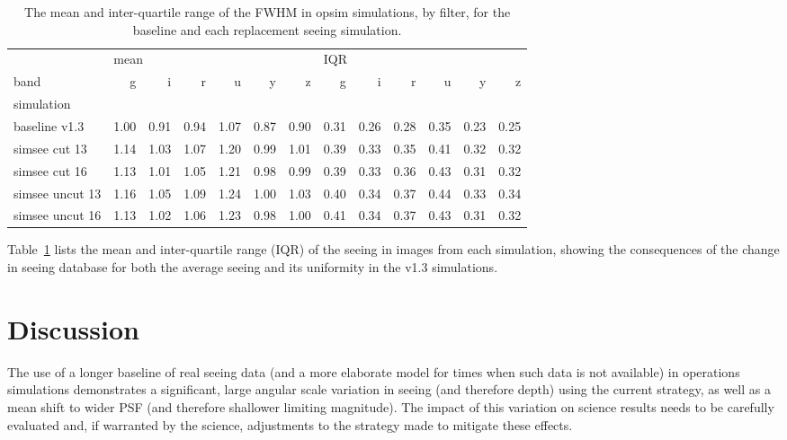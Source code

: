 \documentclass[DM,authoryear,toc]{lsstdoc}
\begin{document}
\begin{table}
\begin{center}
\begin{tabular}{lrrrrrrrrrrrr}
\hline
{} & \multicolumn{6}{l}{mean} & \multicolumn{6}{l}{IQR} \\
band &     g &     i &     r &     u &     y &     z &     g &     i &     r &     u &     y &     z \\
simulation      &       &       &       &       &       &       &       &       &       &       &       &       \\
\hline
baseline v1.3   &  1.00 &  0.91 &  0.94 &  1.07 &  0.87 &  0.90 &  0.31 &  0.26 &  0.28 &  0.35 &  0.23 &  0.25 \\
simsee cut 13   &  1.14 &  1.03 &  1.07 &  1.20 &  0.99 &  1.01 &  0.39 &  0.33 &  0.35 &  0.41 &  0.32 &  0.32 \\
simsee cut 16   &  1.13 &  1.01 &  1.05 &  1.21 &  0.98 &  0.99 &  0.39 &  0.33 &  0.36 &  0.43 &  0.31 &  0.32 \\
simsee uncut 13 &  1.16 &  1.05 &  1.09 &  1.24 &  1.00 &  1.03 &  0.40 &  0.34 &  0.37 &  0.44 &  0.33 &  0.34 \\
simsee uncut 16 &  1.13 &  1.02 &  1.06 &  1.23 &  0.98 &  1.00 &  0.41 &  0.34 &  0.37 &  0.43 &  0.31 &  0.32 \\
\hline
\end{tabular}
\caption{The mean and inter-quartile range of the FWHM in opsim
  simulations, by filter, for the baseline and each replacement seeing
  simulation.}\label{tab:sim-stats}
\end{center}
\end{table}

Table~\ref{tab:sim-stats} lists the mean and inter-quartile range (IQR) of the seeing in images from each simulation, showing the consequences of the change in seeing database for both the average seeing and its uniformity in the v1.3 simulations.


\section{Discussion}
\label{sec:discussion}

The use of a longer baseline of real seeing data (and a more elaborate
model for times when such data is not available) in operations
simulations demonstrates a significant, large angular scale variation
in seeing (and therefore depth) using the current strategy, as well as
a mean shift to wider PSF (and therefore shallower limiting
magnitude). The impact of this variation on science results needs to
be carefully evaluated and, if warranted by the science, adjustments
to the strategy made to mitigate these effects.
\end{document}
